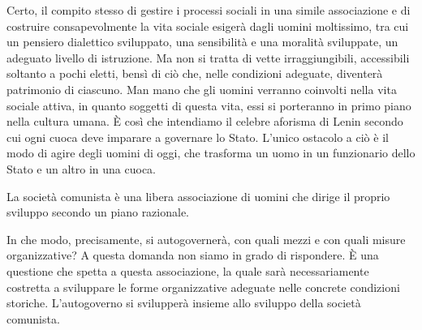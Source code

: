 \documentclass[../main]{subfiles}
\begin{document}
Certo, il compito stesso di gestire i processi sociali in una simile associazione e di costruire consapevolmente la vita sociale esigerà dagli uomini moltissimo, tra cui un pensiero dialettico sviluppato, una sensibilità e una moralità sviluppate, un adeguato livello di istruzione. Ma non si tratta di vette irraggiungibili, accessibili soltanto a pochi eletti, bensì di ciò che, nelle condizioni adeguate, diventerà patrimonio di ciascuno. Man mano che gli uomini verranno coinvolti nella vita sociale attiva, in quanto soggetti di questa vita, essi si porteranno in primo piano nella cultura umana. È così che intendiamo il celebre aforisma di Lenin secondo cui ogni cuoca deve imparare a governare lo Stato. L'unico ostacolo a ciò è il modo di agire degli uomini di oggi, che trasforma un uomo in un funzionario dello Stato e un altro in una cuoca.

La società comunista è una libera associazione di uomini che dirige il proprio sviluppo secondo un piano razionale.

In che modo, precisamente, si autogovernerà, con quali mezzi e con quali misure organizzative? A questa domanda non siamo in grado di rispondere. È una questione che spetta a questa associazione, la quale sarà necessariamente costretta a sviluppare le forme organizzative adeguate nelle concrete condizioni storiche. L'autogoverno si svilupperà insieme allo sviluppo della società comunista.
\end{document}
